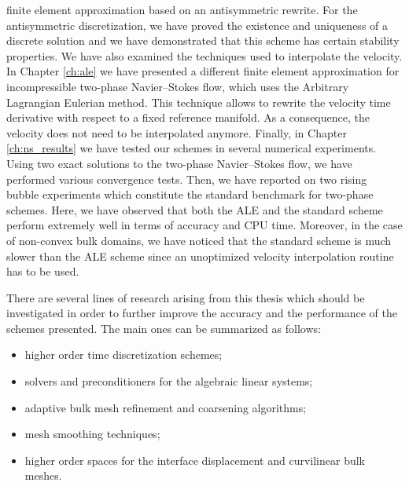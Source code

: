 finite element approximation based on an antisymmetric rewrite. For the
antisymmetric discretization, we have proved the existence and uniqueness of a
discrete solution and we have demonstrated that this scheme has certain
stability properties. We have also examined the techniques used to interpolate
the velocity. In Chapter \ref{ch:ale} we have presented a different finite
element approximation for incompressible two-phase Navier--Stokes flow, which
uses the Arbitrary Lagrangian Eulerian method. This technique allows to
rewrite the velocity time derivative with respect to a fixed reference
manifold. As a consequence, the velocity does not need to be interpolated
anymore. Finally, in Chapter \ref{ch:ns_results} we have tested our schemes in
several numerical experiments. Using two exact solutions to the two-phase
Navier--Stokes flow, we have performed various convergence tests. Then, we have
reported on two rising bubble experiments which constitute the standard
benchmark for two-phase schemes. Here, we have observed that both the ALE and
the standard scheme perform extremely well in terms of accuracy and CPU time.
Moreover, in the case of non-convex bulk domains, we have noticed that the
standard scheme is much slower than the ALE scheme since an unoptimized velocity
interpolation routine has to be used.

There are several lines of research arising from this thesis which should be
investigated in order to further improve the accuracy and the performance of
the schemes presented. The main ones can be summarized as follows:
\begin{itemize}
\item higher order time discretization schemes;
\item solvers and preconditioners for the algebraic linear systems;
\item adaptive bulk mesh refinement and coarsening algorithms;
\item mesh smoothing techniques;
\item higher order spaces for the interface displacement and curvilinear
bulk meshes.
\end{itemize}
